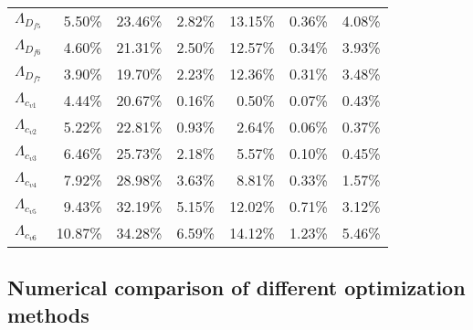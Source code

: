 \documentclass[preprint,12pt]{elsarticle}
\begin{document}
\begin{table}[htbp]
\begin{tabular}{lrrrrrr}
    $\Lambda_{D_{f5}}$ & 5.50\% & 23.46\% & 2.82\% & 13.15\% & 0.36\% & 4.08\% \\
    $\Lambda_{D_{f6}}$& 4.60\% & 21.31\% & 2.50\% & 12.57\% & 0.34\% & 3.93\% \\
    $\Lambda_{D_{f7}}$ & 3.90\% & 19.70\% & 2.23\% & 12.36\% & 0.31\% & 3.48\% \\
    $\Lambda_{c_{v1}}$ & 4.44\% & 20.67\% & 0.16\% & 0.50\% & 0.07\% & 0.43\% \\
    $\Lambda_{c_{v2}}$ & 5.22\% & 22.81\% & 0.93\% & 2.64\% & 0.06\% & 0.37\% \\
    $\Lambda_{c_{v3}}$ & 6.46\% & 25.73\% & 2.18\% & 5.57\% & 0.10\% & 0.45\% \\
    $\Lambda_{c_{v4}}$ & 7.92\% & 28.98\% & 3.63\% & 8.81\% & 0.33\% & 1.57\% \\
    $\Lambda_{c_{v5}}$ & 9.43\% & 32.19\% & 5.15\% & 12.02\% & 0.71\% & 3.12\% \\
    $\Lambda_{c_{v6}}$ & 10.87\% & 34.28\% & 6.59\% & 14.12\% & 1.23\% & 5.46\% \\
    \bottomrule
    \end{tabular}%
  \label{tab:summaryevatestbed}%
\end{table}%



\subsection{Numerical comparison of different optimization methods}
\end{document}
